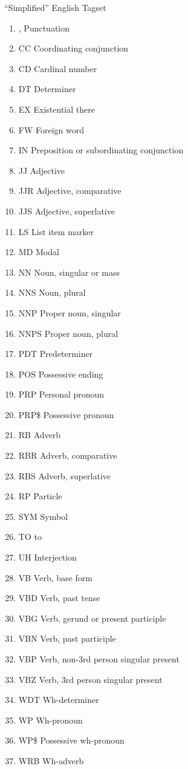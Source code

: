 \documentclass{beamer}
\begin{document}
\begin{frame}[allowframebreaks,t]{``Simplified'' English Tagset}
  \begin{enumerate}
  \item , Punctuation
  \item CC Coordinating conjunction
  \item CD Cardinal number
  \item DT Determiner
  \item EX Existential there
  \item FW Foreign word
  \item IN Preposition or subordinating conjunction
  \item  JJ Adjective
  \item JJR Adjective, comparative
  \item JJS Adjective, superlative
  \item LS List item marker
  \item MD Modal
  \item NN Noun, singular or mass
  \item NNS Noun, plural
  \item NNP Proper noun, singular
  \item NNPS Proper noun, plural
  \item PDT Predeterminer
  \item POS Possessive ending
  \item PRP Personal pronoun
  \item PRP\$ Possessive pronoun
  \item RB Adverb
  \item RBR Adverb, comparative
  \item RBS Adverb, superlative
  \item RP Particle
  \item SYM Symbol
  \item TO to
  \item UH Interjection
  \item VB Verb, base form
  \item VBD Verb, past tense
  \item VBG Verb, gerund or present participle
  \item VBN Verb, past participle
  \item VBP Verb, non-3rd person singular present
  \item VBZ Verb, 3rd person singular present
  \item WDT Wh-determiner
  \item WP  Wh-pronoun
  \item WP\$ Possessive wh-pronoun
  \item WRB Wh-adverb
  \end{enumerate}
\end{frame}
\end{document}
